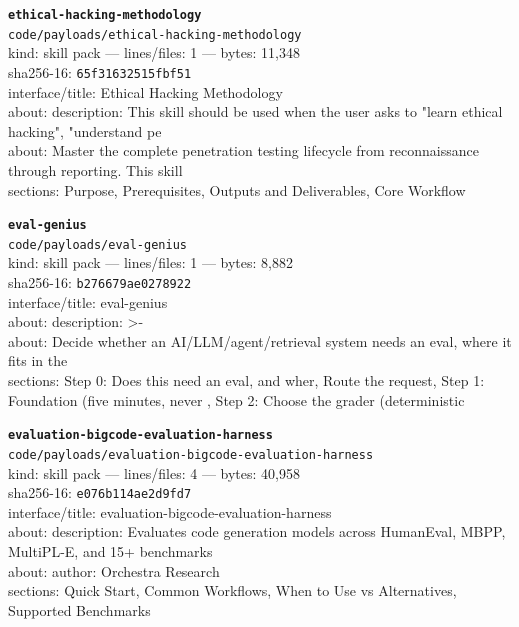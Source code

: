 \noindent\textbf{\texttt{ethical-hacking-methodology}}\\
\texttt{code/payloads/ethical-hacking-methodology}\\
kind: skill pack --- lines/files: 1 --- bytes: 11,348\\
sha256-16: \texttt{65f31632515fbf51}\\
interface/title: Ethical Hacking Methodology\\
about: description: This skill should be used when the user asks to "learn ethical hacking", "understand pe\\
about: Master the complete penetration testing lifecycle from reconnaissance through reporting. This skill \\
sections: Purpose, Prerequisites, Outputs and Deliverables, Core Workflow\\
\vspace*{6.0pt}

\noindent\textbf{\texttt{eval-genius}}\\
\texttt{code/payloads/eval-genius}\\
kind: skill pack --- lines/files: 1 --- bytes: 8,882\\
sha256-16: \texttt{b276679ae0278922}\\
interface/title: eval-genius\\
about: description: >-\\
about: Decide whether an AI/LLM/agent/retrieval system needs an eval, where it fits in the\\
sections: Step 0: Does this need an eval, and wher, Route the request, Step 1: Foundation (five minutes, never , Step 2: Choose the grader (deterministic\\
\vspace*{6.0pt}

\noindent\textbf{\texttt{evaluation-bigcode-evaluation-harness}}\\
\texttt{code/payloads/evaluation-bigcode-evaluation-harness}\\
kind: skill pack --- lines/files: 4 --- bytes: 40,958\\
sha256-16: \texttt{e076b114ae2d9fd7}\\
interface/title: evaluation-bigcode-evaluation-harness\\
about: description: Evaluates code generation models across HumanEval, MBPP, MultiPL-E, and 15+ benchmarks \\
about: author: Orchestra Research\\
sections: Quick Start, Common Workflows, When to Use vs Alternatives, Supported Benchmarks\\
\vspace*{6.0pt}
\newpage

